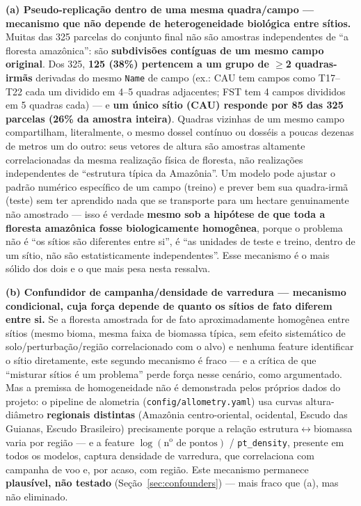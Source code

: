 \textbf{(a) Pseudo-replicação dentro de uma mesma quadra/campo --- mecanismo que
não depende de heterogeneidade biológica entre sítios.} Muitas das 325 parcelas do
conjunto final não são amostras independentes de ``a floresta amazônica'': são
\textbf{subdivisões contíguas de um mesmo campo original}. Dos 325, \textbf{125
(38\%) pertencem a um grupo de $\geq$2 quadras-irmãs} derivadas do mesmo
\texttt{Name} de campo (ex.: CAU tem campos como T17--T22 cada um dividido em 4--5
quadras adjacentes; FST tem 4 campos divididos em 5 quadras cada) --- e \textbf{um
único sítio (CAU) responde por 85 das 325 parcelas (26\% da amostra inteira)}.
Quadras vizinhas de um mesmo campo compartilham, literalmente, o mesmo dossel
contínuo ou dosséis a poucas dezenas de metros um do outro: seus vetores de altura
são amostras altamente correlacionadas da mesma realização física de floresta, não
realizações independentes de ``estrutura típica da Amazônia''. Um modelo pode
ajustar o padrão numérico específico de um campo (treino) e prever bem sua
quadra-irmã (teste) sem ter aprendido nada que se transporte para um hectare
genuinamente não amostrado --- isso é verdade \textbf{mesmo sob a hipótese de que
toda a floresta amazônica fosse biologicamente homogênea}, porque o problema não é
``os sítios são diferentes entre si'', é ``as unidades de teste e treino, dentro de
um sítio, não são estatisticamente independentes''. Esse mecanismo é o mais sólido
dos dois e o que mais pesa nesta ressalva.

\textbf{(b) Confundidor de campanha/densidade de varredura --- mecanismo
condicional, cuja força depende de quanto os sítios de fato diferem entre si.} Se a
floresta amostrada for de fato aproximadamente homogênea entre sítios (mesmo bioma,
mesma faixa de biomassa típica, sem efeito sistemático de solo/perturbação/região
correlacionado com o alvo) e nenhuma feature identificar o sítio diretamente, este
segundo mecanismo é fraco --- e a crítica de que ``misturar sítios é um problema''
perde força nesse cenário, como argumentado. Mas a premissa de homogeneidade não é
demonstrada pelos próprios dados do projeto: o pipeline de alometria
(\texttt{config/allometry.yaml}) usa curvas altura-diâmetro \textbf{regionais
distintas} (Amazônia centro-oriental, ocidental, Escudo das Guianas, Escudo
Brasileiro) precisamente porque a relação estrutura$\leftrightarrow$biomassa varia
por região --- e a feature $\log(\text{n}^{\text{o}}\text{ de pontos})$ /
\texttt{pt\_density}, presente em todos os modelos, captura densidade de varredura,
que correlaciona com campanha de voo e, por acaso, com região. Este mecanismo
permanece \textbf{plausível, não testado} (Seção~\ref{sec:confounders}) --- mais
fraco que (a), mas não eliminado.

